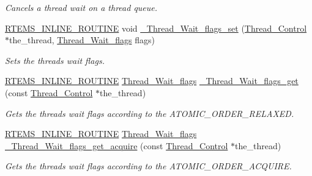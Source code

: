 \begin{DoxyCompactItemize}
\begin{DoxyCompactList}\small\item\em Cancels a thread wait on a thread queue. \end{DoxyCompactList}\item 
\mbox{\hyperlink{group__RTEMSScoreBaseDefs_gac216239df231d5dbd15e3520b0b9313f}{R\+T\+E\+M\+S\+\_\+\+I\+N\+L\+I\+N\+E\+\_\+\+R\+O\+U\+T\+I\+NE}} void \mbox{\hyperlink{group__RTEMSScoreThread_ga8eb26230b102f8569856d170145a925c}{\+\_\+\+Thread\+\_\+\+Wait\+\_\+flags\+\_\+set}} (\mbox{\hyperlink{struct__Thread__Control}{Thread\+\_\+\+Control}} $\ast$the\+\_\+thread, \mbox{\hyperlink{group__RTEMSScoreThread_ga9a047ae9c77bc90a258203d4f2cc57db}{Thread\+\_\+\+Wait\+\_\+flags}} flags)
\begin{DoxyCompactList}\small\item\em Sets the thread\textquotesingle{}s wait flags. \end{DoxyCompactList}\item 
\mbox{\hyperlink{group__RTEMSScoreBaseDefs_gac216239df231d5dbd15e3520b0b9313f}{R\+T\+E\+M\+S\+\_\+\+I\+N\+L\+I\+N\+E\+\_\+\+R\+O\+U\+T\+I\+NE}} \mbox{\hyperlink{group__RTEMSScoreThread_ga9a047ae9c77bc90a258203d4f2cc57db}{Thread\+\_\+\+Wait\+\_\+flags}} \mbox{\hyperlink{group__RTEMSScoreThread_ga7c33d34fc273256480b86586c6be431e}{\+\_\+\+Thread\+\_\+\+Wait\+\_\+flags\+\_\+get}} (const \mbox{\hyperlink{struct__Thread__Control}{Thread\+\_\+\+Control}} $\ast$the\+\_\+thread)
\begin{DoxyCompactList}\small\item\em Gets the thread\textquotesingle{}s wait flags according to the A\+T\+O\+M\+I\+C\+\_\+\+O\+R\+D\+E\+R\+\_\+\+R\+E\+L\+A\+X\+ED. \end{DoxyCompactList}\item 
\mbox{\hyperlink{group__RTEMSScoreBaseDefs_gac216239df231d5dbd15e3520b0b9313f}{R\+T\+E\+M\+S\+\_\+\+I\+N\+L\+I\+N\+E\+\_\+\+R\+O\+U\+T\+I\+NE}} \mbox{\hyperlink{group__RTEMSScoreThread_ga9a047ae9c77bc90a258203d4f2cc57db}{Thread\+\_\+\+Wait\+\_\+flags}} \mbox{\hyperlink{group__RTEMSScoreThread_ga51f70e86f9127bf1dbb0295590c81a45}{\+\_\+\+Thread\+\_\+\+Wait\+\_\+flags\+\_\+get\+\_\+acquire}} (const \mbox{\hyperlink{struct__Thread__Control}{Thread\+\_\+\+Control}} $\ast$the\+\_\+thread)
\begin{DoxyCompactList}\small\item\em Gets the thread\textquotesingle{}s wait flags according to the A\+T\+O\+M\+I\+C\+\_\+\+O\+R\+D\+E\+R\+\_\+\+A\+C\+Q\+U\+I\+RE. \end{DoxyCompactList}\item 

\end{DoxyCompactItemize}
